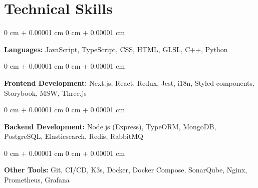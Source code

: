 \documentclass[10pt, letterpaper]{article}
\newenvironment{onecolentry}{
    \begin{adjustwidth}{
        0 cm + 0.00001 cm
    }{
        0 cm + 0.00001 cm
    }
}{
    \end{adjustwidth}
} %
\begin{document}
    \section{Technical Skills}

        \begin{onecolentry}
            \textbf{Languages:} JavaScript, TypeScript, CSS, HTML, GLSL, C++, Python
        \end{onecolentry}

        \vspace{0.2 cm}

        \begin{onecolentry}
            \textbf{Frontend Development:} Next.js, React, Redux, Jest, i18n, Styled-components, Storybook, MSW, Three.js
        \end{onecolentry}

        \vspace{0.2 cm}
        
        \begin{onecolentry}
            \textbf{Backend Development:} Node.js (Express), TypeORM, MongoDB, PostgreSQL, Elasticsearch, Redis, RabbitMQ
        \end{onecolentry}

        \vspace{0.2 cm}

        \begin{onecolentry}
            \textbf{Other Tools:} Git, CI/CD, K3s, Docker, Docker Compose, SonarQube, Nginx, Prometheus, Grafana
        \end{onecolentry}
\end{document}
